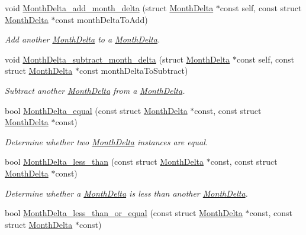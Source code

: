 \begin{DoxyCompactItemize}
void \hyperlink{month-delta_8h_a9f725b1f782ab8ddd1aa734d2cdbce27}{\-Month\-Delta\-\_\-add\-\_\-month\-\_\-delta} (struct \hyperlink{structMonthDelta}{\-Month\-Delta} $\ast$const self, const struct \hyperlink{structMonthDelta}{\-Month\-Delta} $\ast$const month\-Delta\-To\-Add)
\begin{DoxyCompactList}\small\item\em \-Add another \hyperlink{structMonthDelta}{\-Month\-Delta} to a \hyperlink{structMonthDelta}{\-Month\-Delta}. \end{DoxyCompactList}\item 
void \hyperlink{month-delta_8h_aba1962383fdb09d60f24b863ee738982}{\-Month\-Delta\-\_\-subtract\-\_\-month\-\_\-delta} (struct \hyperlink{structMonthDelta}{\-Month\-Delta} $\ast$const self, const struct \hyperlink{structMonthDelta}{\-Month\-Delta} $\ast$const month\-Delta\-To\-Subtract)
\begin{DoxyCompactList}\small\item\em \-Subtract another \hyperlink{structMonthDelta}{\-Month\-Delta} from a \hyperlink{structMonthDelta}{\-Month\-Delta}. \end{DoxyCompactList}\item 
bool \hyperlink{month-delta_8h_a346d0c310255f1f720506a15446497a3}{\-Month\-Delta\-\_\-equal} (const struct \hyperlink{structMonthDelta}{\-Month\-Delta} $\ast$const, const struct \hyperlink{structMonthDelta}{\-Month\-Delta} $\ast$const)
\begin{DoxyCompactList}\small\item\em \-Determine whether two \hyperlink{structMonthDelta}{\-Month\-Delta} instances are equal. \end{DoxyCompactList}\item 
bool \hyperlink{month-delta_8h_ac38bd594e6541d7943021c7fcf337c9d}{\-Month\-Delta\-\_\-less\-\_\-than} (const struct \hyperlink{structMonthDelta}{\-Month\-Delta} $\ast$const, const struct \hyperlink{structMonthDelta}{\-Month\-Delta} $\ast$const)
\begin{DoxyCompactList}\small\item\em \-Determine whether a \hyperlink{structMonthDelta}{\-Month\-Delta} is less than another \hyperlink{structMonthDelta}{\-Month\-Delta}. \end{DoxyCompactList}\item 
bool \hyperlink{month-delta_8h_a6aa021d2410c395010cb579eb49249db}{\-Month\-Delta\-\_\-less\-\_\-than\-\_\-or\-\_\-equal} (const struct \hyperlink{structMonthDelta}{\-Month\-Delta} $\ast$const, const struct \hyperlink{structMonthDelta}{\-Month\-Delta} $\ast$const)

\end{DoxyCompactItemize}
